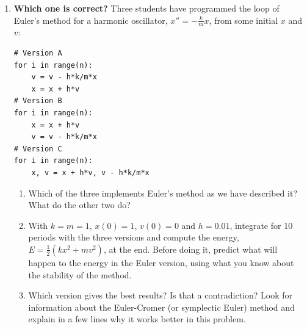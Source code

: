 \begin{enumerate}
\item \label{ej:cual_euler-en} \textbf{Which one is correct?} Three students have programmed the loop of Euler's method for a harmonic oscillator, $x''=-\frac{k}{m}x$, from some initial $x$ and $v$:
\begin{verbatim}
# Version A
for i in range(n):
    v = v - h*k/m*x
    x = x + h*v
# Version B
for i in range(n):
    x = x + h*v
    v = v - h*k/m*x
# Version C
for i in range(n):
    x, v = x + h*v, v - h*k/m*x
\end{verbatim}
\begin{enumerate}
\item Which of the three implements Euler's method as we have described it? What do the other two do?
\item With $k=m=1$, $x(0)=1$, $v(0)=0$ and $h=0.01$, integrate for 10 periods with the three versions and compute the energy, $E=\frac12(kx^2+mv^2)$, at the end. Before doing it, predict what will happen to the energy in the Euler version, using what you know about the stability of the method.
\item Which version gives the best results? Is that a contradiction? Look for information about the Euler-Cromer (or symplectic Euler) method and explain in a few lines why it works better in this problem.
\end{enumerate}


\end{enumerate}
